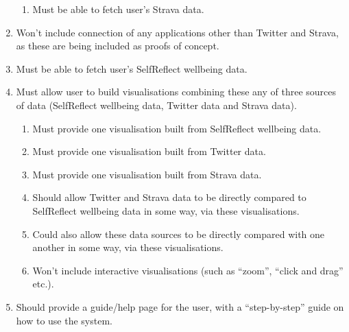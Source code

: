 \documentclass[11pt,openright,a4paper]{report}
\begin{document}
\begin{enumerate}
\begin{enumerate}
  \item Must be able to fetch user's Strava data.
  \end{enumerate}
\item Won't include connection of any applications other than Twitter and Strava, as these are being included as proofs of concept.
\item Must be able to fetch user's SelfReflect wellbeing data.
\item Must allow user to build visualisations combining these any of three sources of data (SelfReflect wellbeing data, Twitter data and Strava data).
  \begin{enumerate}
  \item Must provide one visualisation built from SelfReflect wellbeing data.
  \item Must provide one visualisation built from Twitter data.
  \item Must provide one visualisation built from Strava data.
  \item Should allow Twitter and Strava data to be directly compared to SelfReflect wellbeing data in some way, via these visualisations.
  \item Could also allow these data sources to be directly compared with one another in some way, via these visualisations.
  \item Won't include interactive visualisations (such as \enquote{zoom}, \enquote{click and drag} etc.).
  \end{enumerate}
\item Should provide a guide/help page for the user, with a \enquote{step-by-step} guide on how to use the system.
\end{enumerate}
\end{document}
